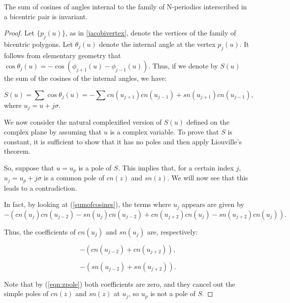 \begin{theorem}
The sum of cosines of angles internal to the family of N-periodics interscribed in a bicentric pair is invariant.
\label{thm:bicentric-sum}
\end{theorem}

\begin{proof}
Let $\{p_{j}(u)\}$, as in  \eqref{jacobivertex}, denote the vertices of the family of bicentric polygons. Let $\theta_{j}(u)$ denote the internal angle at the vertex $p_{j}(u)$. It follows from elementary geometry that
$\cos{\theta_{j}(u)}=-\cos({\phi_{j+1}(u)-\phi_{j-1}(u)}).$
Thus, if we denote by $S(u)$ the sum of the cosines of the internal angles, we have:

\begin{equation}
\label{sumofcosines}
S(u)=\sum \cos{\theta_{j}(u)}=-\sum{cn(u_{j+1})cn(u_{j-1})+sn(u_{j+1})cn(u_{j-1})},
\end{equation}
where $u_{j}=u+j\sigma$.

We now consider the natural complexified version of $S(u)$ defined on the complex plane by assuming that $u$ is a complex variable. To prove that $S$ is constant, it is sufficient to show that it has no poles and then apply Liouville's theorem.

So, suppose that $u=u_p$ is a pole of $S$. This implies that, for a certain index $j$, $u_{j}=u_{p}+j\sigma$ is a common pole of $cn(z)$ and $sn(z)$. We will now see that this leads to a contradiction.

In fact, by looking at (\ref{sumofcosines}), the terms where $u_{j}$ appears are given by
$$-(cn(u_{j})cn(u_{j-2})-sn(u_{j})cn(u_{j-2})+cn(u_{j+2})cn(u_{j})-sn(u_{j+2})cn(u_{j})).$$

Thus, the coefficients of $cn(u_{j})$ and $sn(u_{j})$ are, respectively:

$$-(cn(u_{j-2})+cn(u_{j+2})),$$

$$-(sn(u_{j-2})+sn(u_{j+2})).$$

Note that by (\ref{eqn:zpole}) both coefficients are zero, and they cancel out the simple poles of $cn(z)$ and $sn(z)$ at $u_{j}$, so $u_{p}$ is not a pole of $S$.   
\end{proof}

